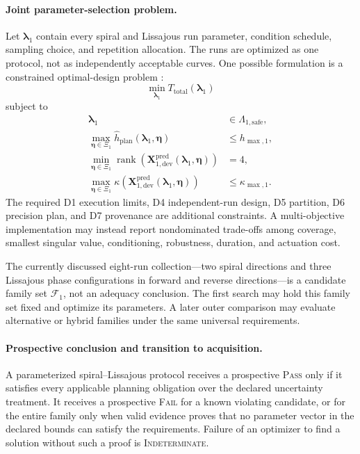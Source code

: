 \documentclass[11pt,a4paper]{article}
\begin{document}
\paragraph{Joint parameter-selection problem.}
Let $\boldsymbol{\lambda}_1$ contain every spiral and Lissajous run parameter,
condition schedule, sampling choice, and repetition allocation. The runs are
optimized as one protocol, not as independently acceptable curves. One
possible formulation is a constrained optimal-design problem
\cite{manchester2010,wilson2014}:
\begin{equation}
    \min_{\boldsymbol{\lambda}_1}
    T_{\mathrm{total}}
    \left(
        \boldsymbol{\lambda}_1
    \right)
\end{equation}
subject to
\begin{align}
    \boldsymbol{\lambda}_1
    &\in
    \Lambda_{1,\mathrm{safe}},\\
    \max_{\boldsymbol{\eta}\in\Xi_1}
    \widehat{h}_{\mathrm{plan}}
    \left(
        \boldsymbol{\lambda}_1,
        \boldsymbol{\eta}
    \right)
    &\leq
    h_{\max,1},\\
    \min_{\boldsymbol{\eta}\in\Xi_1}
    \operatorname{rank}
    \left(
        \mathbf{X}_{1,\mathrm{dev}}^{\mathrm{pred}}
        \left(
            \boldsymbol{\lambda}_1,
            \boldsymbol{\eta}
        \right)
    \right)
    &=4,\\
    \max_{\boldsymbol{\eta}\in\Xi_1}
    \kappa
    \left(
        \mathbf{X}_{1,\mathrm{dev}}^{\mathrm{pred}}
        \left(
            \boldsymbol{\lambda}_1,
            \boldsymbol{\eta}
        \right)
    \right)
    &\leq
    \kappa_{\max,1}.
\end{align}
The required D1 execution limits, D4 independent-run design, D5 partition,
D6 precision plan, and D7 provenance are additional constraints. A
multi-objective implementation may instead report nondominated trade-offs
among coverage, smallest singular value, conditioning, robustness, duration,
and actuation cost.

The currently discussed eight-run collection---two spiral directions and
three Lissajous phase configurations in forward and reverse directions---is a
candidate family set $\mathcal{F}_1$, not an adequacy conclusion. The first
search may hold this family set fixed and optimize its parameters. A later
outer comparison may evaluate alternative or hybrid families under the same
universal requirements.

\paragraph{Prospective conclusion and transition to acquisition.}
A parameterized spiral--Lissajous protocol receives a prospective
\textsc{Pass} only if it satisfies every applicable planning obligation over
the declared uncertainty treatment. It receives a prospective \textsc{Fail}
for a known violating candidate, or for the entire family only when valid
evidence proves that no parameter vector in the declared bounds can satisfy
the requirements. Failure of an optimizer to find a solution without such a
proof is \textsc{Indeterminate}.
\end{document}
